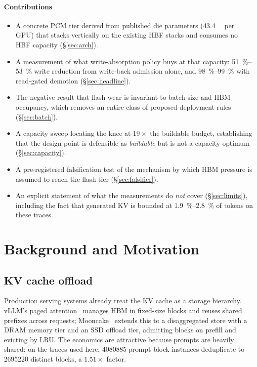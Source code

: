 \documentclass[conference]{IEEEtran}
\begin{document}
\paragraph{Contributions}
\begin{itemize}
  \item A concrete PCM tier derived from published die parameters
        (\SI{43.4}{\gibi\byte} per GPU) that stacks vertically on the existing
        HBF stacks and consumes no HBF capacity (\S\ref{sec:arch}).
  \item A measurement of what write-absorption policy buys at that capacity:
        \SIrange{51}{53}{\percent} write reduction from write-back admission
        alone, and \SIrange{98}{99}{\percent} with read-gated demotion
        (\S\ref{sec:headline}).
  \item The negative result that flash wear is invariant to batch size and HBM
        occupancy, which removes an entire class of proposed deployment rules
        (\S\ref{sec:batch}).
  \item A capacity sweep locating the knee at $19\times$ the buildable budget,
        establishing that the design point is defensible as \emph{buildable} but
        is not a capacity optimum (\S\ref{sec:capacity}).
  \item A pre-registered falsification test of the mechanism by which HBM
        pressure is assumed to reach the flash tier (\S\ref{sec:falsifier}).
  \item An explicit statement of what the measurements do \emph{not} cover
        (\S\ref{sec:limits}), including the fact that generated KV is bounded at
        \SIrange{1.9}{2.8}{\percent} of tokens on these traces.
\end{itemize}

\section{Background and Motivation}

\subsection{KV cache offload}
Production serving systems already treat the KV cache as a storage hierarchy.
vLLM's paged attention~\cite{vllm} manages HBM in fixed-size blocks and reuses
shared prefixes across requests; Mooncake~\cite{mooncake} extends this to a
disaggregated store with a DRAM memory tier and an SSD offload tier, admitting
blocks on prefill and evicting by LRU. The economics are attractive because
prompts are heavily shared: on the traces used here, \num{4080885} prompt-block
instances deduplicate to \num{2695220} distinct blocks, a $1.51\times$ factor.
\end{document}
